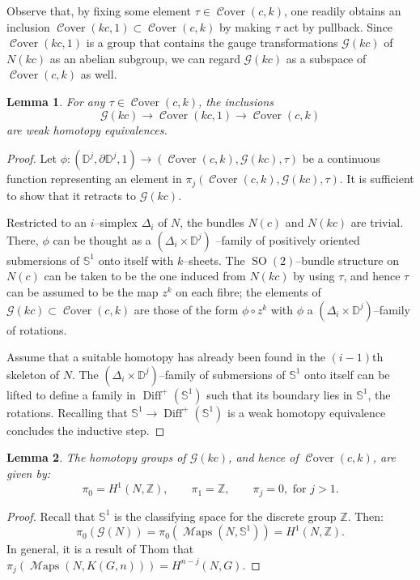 \documentclass[10pt]{amsart}
\newcommand{\Diff}{\operatorname{Diff}}
\newcommand{\SO}{\operatorname{SO}}
\newcommand{\Cover}{\operatorname{\mathcal{C}over}}
\newcommand{\Maps}{\operatorname{\mathcal{M}aps}}
\newcommand{\SG}{{\mathcal{G}}}
\newcommand{\Z}{{\mathbb{Z}}}
\newcommand{\NS}{{\mathbb{S}}}
\newcommand{\D}{{\mathbb{D}}}
\newtheorem{lemma}{Lemma}
\theoremstyle{definition}
\begin{document}
Observe that, by fixing some element $\tau \in \Cover(c,k)$, one readily obtains an inclusion $\Cover(kc,1) \subset \Cover(c,k)$ by making $\tau$ act by pullback. Since $\Cover(kc,1)$ is a group that contains the gauge transformations $\SG(kc)$ of $N(kc)$ as an abelian subgroup, we can regard $\SG(kc)$ as a subspace of $\Cover(c,k)$ as well. 

\begin{lemma} \label{lem:retractions}
For any $\tau \in \Cover(c,k)$, the inclusions
\[ \SG(kc) \to \Cover(kc,1) \to \Cover(c,k) \]
are weak homotopy equivalences.
\end{lemma}
\begin{proof}
Let $\phi: (\D^j,\partial \D^j, 1) \to (\Cover(c,k),\SG(kc), \tau)$ be a continuous function representing an element in $\pi_j(\Cover(c,k),\SG(kc),\tau)$. It is sufficient to show that it retracts to $\SG(kc)$.

Restricted to an $i$--simplex $\Delta_i$ of $N$, the bundles $N(c)$ and $N(kc)$ are trivial. There, $\phi$ can be thought as a $(\Delta_i \times \D^j)$ --family of positively oriented submersions of $\NS^1$ onto itself with $k$--sheets. The $\SO(2)$--bundle structure on $N(c)$ can be taken to be the one induced from $N(kc)$ by using $\tau$, and hence $\tau$ can be assumed to be the map $z^k$ on each fibre; the elements of $\SG(kc) \subset \Cover(c,k)$ are those of the form $\phi \circ z^k$ with $\phi$ a $(\Delta_i \times \D^j)$--family of rotations.

Assume that a suitable homotopy has already been found in the $(i-1)$th skeleton of $N$. The $(\Delta_i \times \D^j)$--family of submersions of $\NS^1$ onto itself can be lifted to define a family in $\Diff^+(\NS^1)$ such that its boundary lies in $\NS^1$, the rotations. Recalling that $\NS^1 \to \Diff^+(\NS^1)$ is a weak homotopy equivalence concludes the inductive step.
\end{proof}

\begin{lemma} \label{lem:homotopy}
The homotopy groups of $\SG(kc)$, and hence of $\Cover(c,k)$, are given by:
\[ \pi_0 = H^1(N, \mathbb{Z}), \qquad \pi_1 = \mathbb{Z}, \qquad \pi_j = 0, \text{ for } j>1. \]
\end{lemma}
\begin{proof}
Recall that $\NS^1$ is the classifying space for the discrete group $\Z$. Then:
\[ \pi_0(\SG(N)) = \pi_0(\Maps(N, \NS^1)) = H^1(N, \mathbb{Z}). \]
In general, it is a result of Thom \cite{Th} that $\pi_j(\Maps(N, K(G,n))) = H^{n-j}(N, G)$. 
\end{proof}
\end{document}
